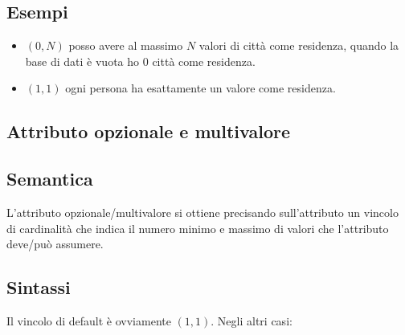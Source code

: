 \documentclass[a4paper, 10pt]{article}
\theoremstyle{definition}
\begin{document}
				\subsection*{Esempi}
					\begin{figure}[h]
					\end{figure}
					\begin{itemize}
						\item $(0,N)$ posso avere al massimo $N$ valori di città come residenza, quando la base di dati è vuota ho $0$ città come residenza.
						\item $(1,1)$ ogni persona ha esattamente un valore come residenza.
					\end{itemize}
					
				\newpage
				
			\subsection{Attributo opzionale e multivalore}
				\subsection*{Semantica}
					L'attributo opzionale/multivalore si ottiene precisando sull'attributo un vincolo di cardinalità che indica il numero minimo e massimo di valori che l'attributo deve/può assumere.
				\subsection*{Sintassi}
					Il vincolo di default è ovviamente $(1,1)$. Negli altri casi:
					
					
\end{document}

